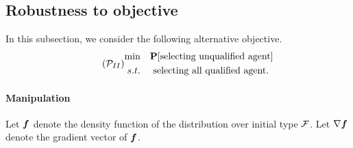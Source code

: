 \subsection{Robustness to objective}\label{sec:Pii}
In this subsection, we consider the following alternative objective.
\begin{equation}\tag{$\mathcal{P}_{II}$}\label{min unqualified}
    \begin{aligned}
        \min & \quad \pr[\text{selecting unqualified agent}] \\
        s.t. & \quad \text{ selecting all qualified agent}.\\
    \end{aligned}
\end{equation}

\paragraph{Manipulation}
Let $\boldsymbol{f}$ denote the density function of the distribution over initial type $\mathcal{F}$.
Let $\nabla \boldsymbol{f}$ denote the gradient vector of $\boldsymbol{f}$.

